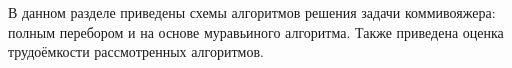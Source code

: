 \label{cha:design}

В данном разделе приведены схемы алгоритмов решения задачи коммивояжера: полным перебором и на основе муравьиного алгоритма. 
Также приведена оценка трудоёмкости рассмотренных алгоритмов.



